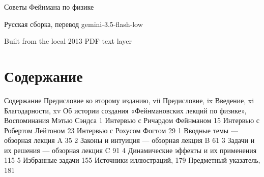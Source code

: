 \documentclass[10pt,oneside]{article}
\begin{document}
\begin{titlepage}
\centering
\vspace*{88bp}
{\fontsize{23}{27}\selectfont Советы Фейнмана по физике\par}
\vspace{16bp}
{\large Русская сборка, перевод gemini-3.5-flash-low\par}
\vfill
{\small Built from the local 2013 PDF text layer\par}
\end{titlepage}
{}
\tableofcontents
\clearpage
{}
\section*{Содержание}
\label{tips-sec-0-содержание}
Содержание Предисловие ко второму изданию, vii Предисловие, ix Введение, xi Благодарности, xv Об истории создания «Фейнмановских лекций по физике», Воспоминания Мэтью Сэндса 1 Интервью с Ричардом Фейнманом 15 Интервью с Робертом Лейтоном 23 Интервью с Рохусом Фогтом 29 1 Вводные темы --- обзорная лекция A 35 2 Законы и интуиция --- обзорная лекция B 61 3 Задачи и их решения --- обзорная лекция C 91 4 Динамические эффекты и их применения 115 5 Избранные задачи 155 Источники иллюстраций, 179 Предметный указатель, 181\par

\clearpage
{}
\end{document}
